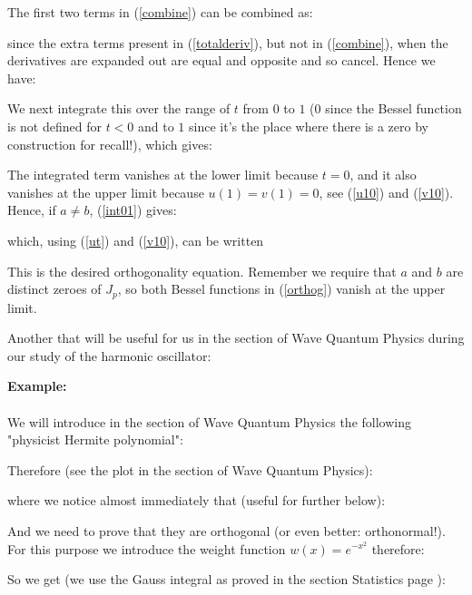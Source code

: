 	\begin{tcolorbox}[colframe=black,colback=white,sharp corners]
	
	The first two terms in (\ref{combine}) can be combined as:
	
	since the extra terms present in (\ref{totalderiv}), but not in (\ref{combine}), when the derivatives are expanded out are equal and opposite and so cancel. Hence we have:
	
	We next integrate this over the range of $t$ from $0$ to $1$ ($0$ since the Bessel function is not defined for $t<0$ and to $1$ since it's the place where there is a zero by construction for recall!), which gives:
	
	The integrated term vanishes at the lower limit because $t=0$, and it also vanishes at the upper limit because $u(1) = v(1) = 0$, see (\ref{u10}) and (\ref{v10}). Hence, if $a \ne b$, (\ref{int01}) gives:
	
	which, using (\ref{ut}) and (\ref{v10}), can be written
	
	This is the desired orthogonality equation. Remember we require that $a$ and $ b$ are distinct zeroes of $J_p$, so both Bessel functions in (\ref{orthog}) vanish at the upper limit.
	\end{tcolorbox}
	
	\pagebreak
	Another that will be useful for us in the section of Wave Quantum Physics during our study of the harmonic oscillator:
	\begin{tcolorbox}[colframe=black,colback=white,sharp corners]
	\textbf{{\Large {}}Example:}\\\\
	We will introduce in the section of Wave Quantum Physics the following "physicist Hermite polynomial\label{hermite polynomial}":
	
	Therefore (see the plot in the section of Wave Quantum Physics):
	
	where we notice almost immediately that (useful for further below):
	
	And we need to prove that they are orthogonal (or even better: orthonormal!).\\
	
	For this purpose we introduce the weight function $w(x)=e^{-x^2}$ therefore:
	
	So we get (we use the Gauss integral as proved in the section Statistics page \pageref{Gauss integral}):
	
	\end{tcolorbox}
	
